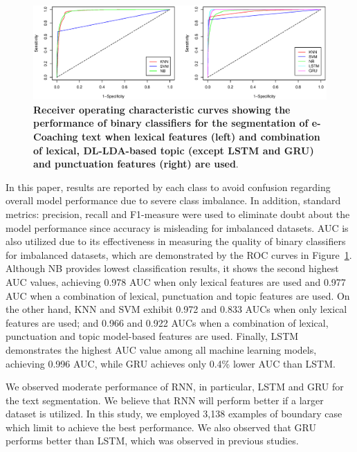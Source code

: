 \documentclass{amia}
\begin{document}
\begin{figure}[!htb]
    \centering
    \includegraphics[width=1.0\textwidth]{figures/roc-curves.eps}
    \caption{\textbf{Receiver operating characteristic curves showing the performance of binary classifiers for the segmentation of e-Coaching text when lexical features (left) and combination of lexical, DL-LDA-based topic (except LSTM and GRU) and punctuation features (right) are used}.}
    \label{fig:roc-curves}
\end{figure}

In this paper, results are reported by each class to avoid confusion regarding overall model performance due to severe class imbalance. In addition, standard metrics: precision, recall and F1-measure were used to eliminate doubt about the model performance since accuracy is misleading for imbalanced datasets. AUC is also utilized due to its effectiveness in measuring the quality of binary classifiers for imbalanced datasets\cite{hu2015kernelized}, which are demonstrated by the ROC curves in Figure~\ref{fig:roc-curves}. Although NB provides lowest classification results, it shows the second highest AUC values, achieving 0.978 AUC when only lexical features are used and 0.977 AUC when a combination of lexical, punctuation and topic features are used. On the other hand, KNN and SVM exhibit 0.972 and 0.833 AUCs when only lexical features are used; and 0.966 and 0.922 AUCs when a combination of lexical, punctuation and topic model-based features are used. Finally, LSTM demonstrates the highest AUC value among all machine learning models, achieving 0.996 AUC, while GRU achieves only 0.4\% lower AUC than LSTM.      

We observed moderate performance of RNN, in particular, LSTM and GRU for the text segmentation. We believe that RNN will perform better if a larger dataset is utilized. In this study, we employed 3,138 examples of boundary case which limit to achieve the best performance. We also observed that GRU performs better than LSTM, which was observed in previous studies\cite{chung2014empirical}.
\end{document}
